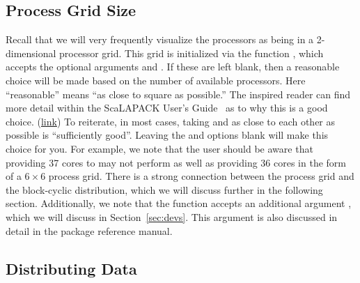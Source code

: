 \subsection[]{Process Grid Size}

Recall that we will very frequently visualize the processors as being in a 2-dimensional processor grid.  This grid is initialized via the function , which accepts the optional arguments  and .  If these are left blank, then a reasonable choice will be made based on the number of available processors.  Here ``reasonable'' means ``as close to square as possible.''  The inspired reader can find more detail within the ScaLAPACK User's Guide~\citep{slug} as to why this is a good choice. (\href{http://www.netlib.org/utk/papers/scalapack/node20.html}{link})
\np
To reiterate, in most cases, taking  and  as close to each other as possible is ``sufficiently good''.  Leaving the  and  options blank will make this choice for you.  For example, we note that the user should be aware that providing 37 cores to  may not perform as well as providing 36 cores in the form of a $6\times6$ process grid.  There is a strong connection between the process grid and the block-cyclic distribution, which we will discuss further in the following section.
\np
Additionally, we note that the  function accepts an additional argument , which we will discuss in Section~\ref{sec:devs}.  This argument is also discussed in detail in the package reference manual.

\subsection[]{Distributing Data}

